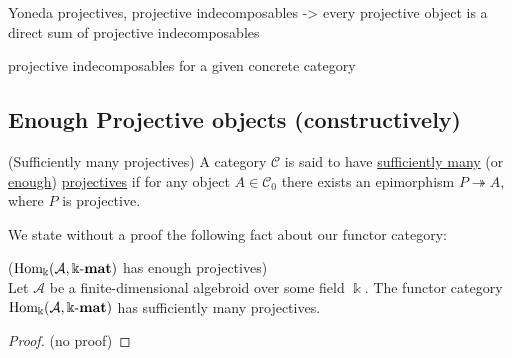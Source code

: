 Yoneda projectives, projective indecomposables -> every projective object is a direct sum of projective indecomposables

projective indecomposables for a given concrete category


\subsection{Enough Projective objects (constructively)}

\begin{definition}{(Sufficiently many projectives)}\label{def:enough_projectives}
A category $\mathcal{C}$ is said to have \ul{sufficiently many} (or \ul{enough}) \ul{projectives} if for any object $A \in \mathcal{C}_{0}$
there exists an epimorphism $P \twoheadrightarrow A$, where $P$ is projective.
\end{definition}

We state without a proof the following fact about our functor category:

\begin{theorem}{($\mathrm{Hom_{\Bbbk}}(\mathcal{A},\Bbbk\textnormal{-}\mathbf{mat})$ has enough projectives)}\\
Let $\mathcal{A}$ be a finite-dimensional algebroid over some field $\Bbbk$. The functor category $\mathrm{Hom_{\Bbbk}}(\mathcal{A},\Bbbk\textnormal{-}\mathbf{mat})$ has sufficiently many
projectives.
\end{theorem}
\begin{proof}
(no proof)
\end{proof}